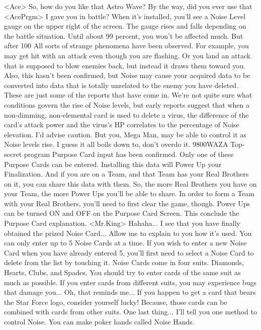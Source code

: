 <Ace> So, how do you like that Astro Wave? 
By the way, did you ever use that <AcePrgm> I gave you in battle? 
When it's installed, you'll see a Noise Level 
gauge on the upper right of the screen. 
The gauge rises and falls depending on the battle situation. 
Until about 99 percent, you won't be affected 
much. But after 100%
All sorts of strange phenomena have been observed. For example, 
you may get hit with an attack even though you are flashing. 
Or you land an attack that is supposed to blow enemies back, 
but instead it draws them toward you. 
Also, this hasn't been confirmed, but Noise may 
cause your acquired data to be converted into data 
that is totally unrelated to the enemy you have deleted. 
These are just some of the reports that have come in. 
We're not quite sure what conditions govern the rise of Noise levels, 
but early reports suggest that when a non-dimming, 
non-elemental card is used to delete a virus, 
the difference of the card's attack power and 
the virus's HP correlates to the percentage of Noise elevation. 
I'd advise caution. But you, Mega Man, may be able to 
control it as Noise levels rise. 
I guess it all boils down to, don't overdo it. 
{98}{00}WAZA Top-secret program Purpose Card input has been confirmed. 
Only one of these Purpose Cards can be entered. 
Installing this data will Power Up your Finalization. 
And if you are on a Team, and that Team has your Real Brothers on it, 
you can share this data with them. 
So, the more Real Brothers you have on your Team, 
the more Power Ups you'll be able to share. 
In order to form a Team with your Real Brothers, 
you'll need to first clear the game, though. 
Power Ups can be turned ON and OFF on the Purpose Card Screen. 
This conclude the Purpose Card explanation. 
<Mr.King> Hahaha... 
I see that you have finally obtained the prized Noise Card... 
Allow me to explain to you how it's used. 
You can only enter up to 5 Noise Cards at a time. 
If you wish to enter a new Noise Card when you have already entered 5, 
you'll first need to select a Noise Card to delete from the list by touching it. 
Noise Cards come in four suits. Diamonds, Hearts, Clubs, and Spades. 
You should try to enter cards of the same suit as much as possible. 
If you enter cards from different suits, 
you may experience bugs that damage you... 
Oh, that reminds me... 
If you happen to get a card that bears the 
Star Force logo, consider yourself lucky! 
Because, those cards can be combined with cards from other suits. 
One last thing... I'll tell you one method to control Noise. 
You can make poker hands called Noise Hands. 
